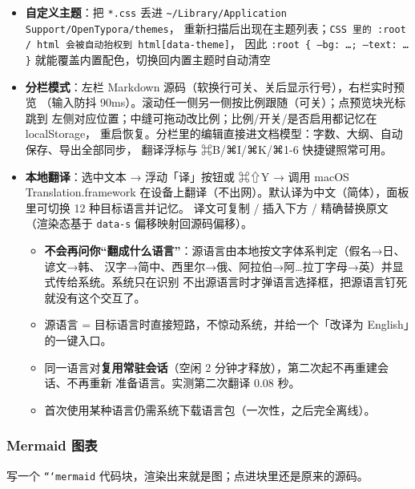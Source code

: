 \documentclass[11pt,a4paper]{ctexart}
\begin{document}
\begin{itemize}
\textbf{自定义导出命令}（名称 / 命令 / 扩展名，上限 12 条，可一键填入 pandoc 预设），
主题下拉里自动列出用户主题；设置存在 localStorage，重启恢复
\item \textbf{自定义主题}：把 \texttt{*.css} 丢进 \texttt{\textasciitilde{}/Library/Application Support/OpenTypora/themes}，
重新扫描后出现在主题列表；\texttt{CSS 里的 :root / html 会被自动抬权到 html[data-theme]}，
因此 \texttt{:root \{ --bg: …; --text: … \}} 就能覆盖内置配色，切换回内置主题时自动清空
\item \textbf{分栏模式}：左栏 Markdown 源码（软换行可关、关后显示行号），右栏实时预览
（输入防抖 90ms）。滚动任一侧另一侧按比例跟随（可关）；点预览块光标跳到
左侧对应位置；中缝可拖动改比例；比例/开关/是否启用都记忆在 localStorage，
重启恢复。分栏里的编辑直接进文档模型：字数、大纲、自动保存、导出全部同步，
翻译浮标与 ⌘B/⌘I/⌘K/⌘1-6 快捷键照常可用。
\item \textbf{本地翻译}：选中文本 → 浮动「译」按钮或 ⌘⇧Y → 调用 macOS Translation.framework
在设备上翻译（不出网）。默认译为中文（简体），面板里可切换 12 种目标语言并记忆。
译文可复制 / 插入下方 / 精确替换原文（渲染态基于 \texttt{data-s} 偏移映射回源码偏移）。
\begin{itemize}
\item \textbf{不会再问你“翻成什么语言”}：源语言由本地按文字体系判定（假名→日、谚文→韩、
汉字→简中、西里尔→俄、阿拉伯→阿…拉丁字母→英）并显式传给系统。系统只在识别
不出源语言时才弹语言选择框，把源语言钉死就没有这个交互了。
\item 源语言 = 目标语言时直接短路，不惊动系统，并给一个「改译为 English」的一键入口。
\item 同一语言对\textbf{复用常驻会话}（空闲 2 分钟才释放），第二次起不再重建会话、不再重新
准备语言。实测第二次翻译 0.08 秒。
\item 首次使用某种语言仍需系统下载语言包（一次性，之后完全离线）。
\end{itemize}
\end{itemize}


\subsubsection{Mermaid 图表}

写一个 \texttt{```mermaid} 代码块，渲染出来就是图；点进块里还是原来的源码。
\end{document}

